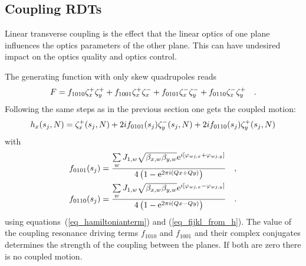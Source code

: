 
\subsection{Coupling RDTs}
\label{sec_coupling_rdts}

Linear transverse coupling is the effect that the linear optics of one plane influences the optics
parameters of the other plane. This can have undesired impact on the optics quality and optics
control.

The generating function with only skew quadrupoles reads
%
\begin{equation}
    F = f_{1010} \zeta_x^+ \zeta_y^+  + f_{1001} \zeta_x^+ \zeta_x^- + f_{0101} \zeta_x^- \zeta_y^- + f_{0110} \zeta_x^- \zeta_y^+
    \quad .
\end{equation}
%
Following the same steps as in the previous section one gets the coupled motion:
%
\begin{equation}
    h_x(s_j,N) = \zeta_x^+(s_j,N) + 2i f_{0101}(s_j) \zeta_y^-(s_j,N) + 2i f_{0110}(s_j) \zeta_y^+(s_j,N)
    \label{eq_coupled_h_from_z}
\end{equation}
%
with
%
\begin{align}
    f_{0101}(s_j) &= \frac{
        \sum\limits_w J_{1,w} \sqrt{\beta_{x,w}\beta_{y,w}}\text{e}^{i\left[\varphi_{wj,x} + \varphi_{wj,y}\right]}
    }{
        4\left( 1- \text{e}^{2\pi i (Qx+Qy)} \right)
    } \quad , \notag \\
    f_{0110}(s_j) &= \frac{
        \sum\limits_w J_{1,w} \sqrt{\beta_{x,w}\beta_{y,w}}\text{e}^{i\left[\varphi_{wj,x} - \varphi_{wj,y}\right]}
    }{
        4\left( 1- \text{e}^{2\pi i (Qx-Qy)} \right)
    }
    \quad .
    \label{eq_f0101_f0110}
\end{align}
%
using equations~(\ref{eq_hamiltonianterm}) and (\ref{eq_fijkl_from_h}).
The value of the coupling resonance driving terms $f_{1010}$ and $f_{1001}$ and their complex conjugates
determines the strength of the coupling between the planes. 
If both are zero there is no coupled motion.

